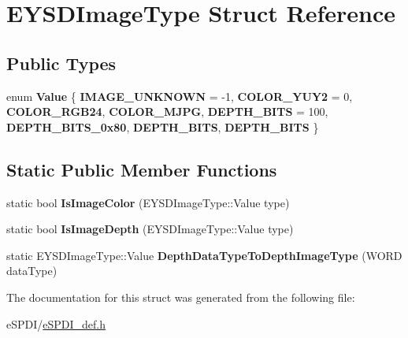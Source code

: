 \hypertarget{struct_e_y_s_d_image_type}{}\section{E\+Y\+S\+D\+Image\+Type Struct Reference}
\label{struct_e_y_s_d_image_type}
\subsection*{Public Types}
\begin{DoxyCompactItemize}
\item 
\mbox{\label{struct_e_y_s_d_image_type_a96e2496186546478f9b377c4aa5e3afc}} 
enum {\bfseries Value} \{ \newline
{\bfseries I\+M\+A\+G\+E\+\_\+\+U\+N\+K\+N\+O\+WN} = -\/1, 
{\bfseries C\+O\+L\+O\+R\+\_\+\+Y\+U\+Y2} = 0, 
{\bfseries C\+O\+L\+O\+R\+\_\+\+R\+G\+B24}, 
{\bfseries C\+O\+L\+O\+R\+\_\+\+M\+J\+PG}, 
\newline
{\bfseries D\+E\+P\+T\+H\+\_\+B\+I\+TS} = 100, 
{\bfseries D\+E\+P\+T\+H\+\_\+B\+I\+T\+S\+\_\+0x80}, 
{\bfseries D\+E\+P\+T\+H\+\_\+B\+I\+TS}, 
{\bfseries D\+E\+P\+T\+H\+\_\+B\+I\+TS}
 \}
\end{DoxyCompactItemize}
\subsection*{Static Public Member Functions}
\begin{DoxyCompactItemize}
\item 
\mbox{\label{struct_e_y_s_d_image_type_a055a72c25f39e49ba71c211d5b3ff09b}} 
static bool {\bfseries Is\+Image\+Color} (E\+Y\+S\+D\+Image\+Type\+::\+Value type)
\item 
\mbox{\label{struct_e_y_s_d_image_type_a4025d19605acc2bc4be4880c62072429}} 
static bool {\bfseries Is\+Image\+Depth} (E\+Y\+S\+D\+Image\+Type\+::\+Value type)
\item 
\mbox{\label{struct_e_y_s_d_image_type_aa6fe422c1479f8eb362acd566f71658f}} 
static E\+Y\+S\+D\+Image\+Type\+::\+Value {\bfseries Depth\+Data\+Type\+To\+Depth\+Image\+Type} (W\+O\+RD data\+Type)
\end{DoxyCompactItemize}


The documentation for this struct was generated from the following file\+:\begin{DoxyCompactItemize}
\item 
e\+S\+P\+D\+I/\hyperlink{e_s_p_d_i__def_8h}{e\+S\+P\+D\+I\+\_\+def.\+h}\end{DoxyCompactItemize}
